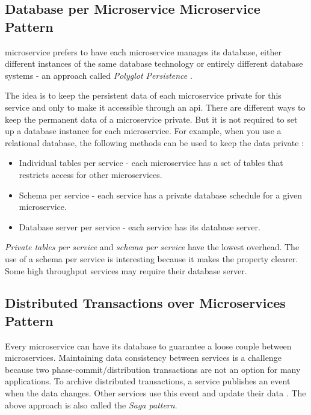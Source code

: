 \subsection{Database per Microservice Microservice Pattern}
\label{subse:database_per_service}

\acrshort{microservice} prefers to have each microservice manages its database, either different instances of the same database technology or entirely different database systems - an approach called \emph{Polyglot Persistence} \cite{LewisMicroservicesManagement}.

The idea is to keep the persistent data of each microservice private for this service and only to make it accessible through an \acrshort{api}.
There are different ways to keep the permanent data of a microservice private. But it is not required to set up a database instance for each microservice. For example, when you use a relational database, the following methods can be used to keep the data private \cite{RichardsonMicroservicesService}:
\begin{itemize}
    \item Individual tables per service - each microservice has a set of tables that restricts access for other microservices.
    \item Schema per service - each service has a private database schedule for a given microservice.
    \item Database server per service - each service has its database server.
\end{itemize}

\emph{Private tables per service} and \emph{schema per service} have the lowest overhead. The use of a schema per service is interesting because it makes the property clearer. Some high throughput services may require their database server.

\subsection{Distributed Transactions over Microservices Pattern}
\label{subse:sagas}

Every microservice can have its database to guarantee a loose couple between microservices. Maintaining data consistency between services is a challenge because two phase-commit/distribution transactions are not an option for many applications. To archive distributed transactions, a service publishes an event when the data changes. Other services use this event and update their data \cite{RichardsonMicroservicesSagas}. The above approach is also called the \emph{Saga pattern}.

